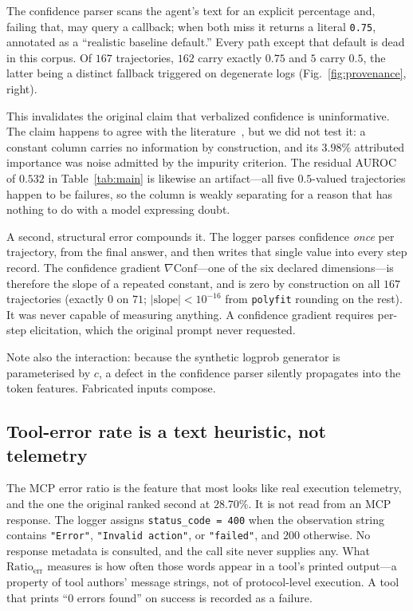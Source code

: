 \documentclass[conference]{IEEEtran}
\begin{document}
The confidence parser scans the agent's text for an explicit percentage and,
failing that, may query a callback; when both miss it returns a literal
\texttt{0.75}, annotated as a ``realistic baseline default.'' Every path except
that default is dead in this corpus. Of $167$ trajectories, $162$ carry exactly
$0.75$ and $5$ carry $0.5$, the latter being a distinct fallback triggered on
degenerate logs (Fig.~\ref{fig:provenance}, right).

This invalidates the original claim that verbalized confidence is
uninformative. The claim happens to agree with the literature~\cite{xiong}, but
we did not test it: a constant column carries no information by construction,
and its $3.98\%$ attributed importance was noise admitted by the impurity
criterion. The residual AUROC of $0.532$ in Table~\ref{tab:main} is likewise an
artifact---all five $0.5$-valued trajectories happen to be failures, so the
column is weakly separating for a reason that has nothing to do with a model
expressing doubt.

A second, structural error compounds it. The logger parses confidence
\emph{once} per trajectory, from the final answer, and then writes that single
value into every step record. The confidence gradient $\nabla\text{Conf}$---one
of the six declared dimensions---is therefore the slope of a repeated
constant, and is zero by construction on all $167$ trajectories (exactly $0$ on
$71$; $|\text{slope}| < 10^{-16}$ from \texttt{polyfit} rounding on the rest).
It was never capable of measuring anything. A confidence gradient requires
per-step elicitation, which the original prompt never requested.

Note also the interaction: because the synthetic logprob generator is
parameterised by $c$, a defect in the confidence parser silently propagates into
the token features. Fabricated inputs compose.

\subsection{Tool-error rate is a text heuristic, not telemetry}
\label{sec:mcp}

The MCP error ratio is the feature that most looks like real execution
telemetry, and the one the original ranked second at $28.70\%$. It is not read
from an MCP response. The logger assigns \texttt{status\_code = 400} when the
observation string contains \texttt{"Error"}, \texttt{"Invalid action"}, or
\texttt{"failed"}, and $200$ otherwise. No response metadata is consulted, and
the call site never supplies any. What $\text{Ratio}_{\text{err}}$ measures is
how often those words appear in a tool's printed output---a property of tool
authors' message strings, not of protocol-level execution. A tool that prints
``0 errors found'' on success is recorded as a failure.
\end{document}
